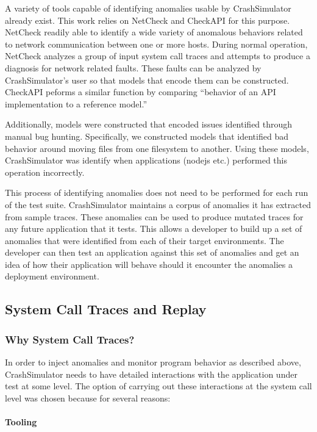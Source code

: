     A variety of tools capable of identifying anomalies usable by CrashSimulator already exist. This work relies on
    NetCheck and CheckAPI for this purpose. NetCheck readily able to identify a wide variety of anomalous behaviors
    related to network communication between one or more hosts. During normal operation, NetCheck analyzes a group of
    input system call traces and attempts to produce a diagnosis for network related faults. These faults can be
    analyzed by CrashSimulator's user so that models that encode them can be constructed. CheckAPI peforms a similar
    function by comparing ``behavior of an API implementation to a reference model.''
    
    Additionally, models were constructed that encoded issues identified through manual bug hunting. Specifically,
    we constructed models that identified bad behavior around moving files from one filesystem to another. Using these
    models, CrashSimulator was identify when applications (nodejs etc.) performed this operation incorrectly.

    This process of identifying anomalies does not need to be performed for each run of the test suite.  CrashSimulator
    maintains a corpus of anomalies it has extracted from sample traces. These anomalies can be used to produce mutated
    traces for any future application that it tests. This allows a developer to build up a set of anomalies that were
    identified from each of their target environments. The developer can then test an application against this set of
    anomalies and get an idea of how their application will behave should it encounter the anomalies a deployment
    environment.

    \subsection{System Call Traces and Replay}

        \subsubsection{Why System Call Traces?}

        In order to inject anomalies and monitor program behavior as described above, CrashSimulator needs to have detailed
        interactions with the application under test at some level.  The option of carrying out these interactions at the
        system call level was chosen because for several reasons:

        \paragraph{Tooling}

